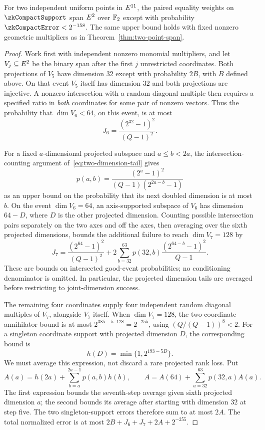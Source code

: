 \begin{theorem}\label{thm:zk-compact-two-point}
For two independent uniform points in $E^{11}$, the paired equality weights on $\zkCompactSupport$ span $E^2$ over $\mathbb{F}_2$ except with probability $\zkCompactError<2^{-158}$. The same upper bound holds with fixed nonzero geometric multipliers as in Theorem~\ref{thm:two-point-span}.
\end{theorem}
\begin{proof}
Work first with independent nonzero monomial multipliers, and let $V_j\subseteq E^2$ be the binary span after the first $j$ unrestricted coordinates. Both projections of $V_5$ have dimension $32$ except with probability $2B$, with $B$ defined above. On that event $V_5$ itself has dimension $32$ and both projections are injective. A nonzero intersection with a random diagonal multiple then requires a specified ratio in \emph{both} coordinates for some pair of nonzero vectors. Thus the probability that $\dim V_6<64$, on this event, is at most
\[
 J_6=\frac{(2^{32}-1)^2}{(Q-1)^2}.
\]

For a fixed $a$-dimensional projected subspace and $a\le b<2a$, the intersection-counting argument of~\eqref{eq:two-dimension-tail} gives
\[
 p(a,b)=\frac{(2^a-1)^2}{(Q-1)(2^{2a-b}-1)}
\]
as an upper bound on the probability that its next doubled dimension is at most $b$. On the event $\dim V_6=64$, an axis-supported subspace of $V_6$ has dimension $64-D$, where $D$ is the other projected dimension. Counting possible intersection pairs separately on the two axes and off the axes, then averaging over the sixth projected dimensions, bounds the additional failure to reach $\dim V_7=128$ by
\[
 J_7=\frac{(2^{64}-1)^2}{(Q-1)^2}
 +2\sum_{b=32}^{63}p(32,b)\frac{(2^{64-b}-1)^2}{Q-1}.
\]
These are bounds on intersected good-event probabilities; no conditioning denominator is omitted. In particular, the projected dimension tails are averaged before restricting to joint-dimension success.

The remaining four coordinates supply four independent random diagonal multiples of $V_7$, alongside $V_7$ itself. When $\dim V_7=128$, the two-coordinate annihilator bound is at most $2^{385-5\cdot128}=2^{-255}$, using $(Q/(Q-1))^8<2$. For a singleton coordinate support with projected dimension $D$, the corresponding bound is
\[
 h(D)=\min\{1,2^{193-5D}\}.
\]
We must average this expression, not discard a rare projected rank loss. Put
\[
 A(a)=h(2a)+\sum_{b=a}^{2a-1}p(a,b)h(b),
 \qquad A=A(64)+\sum_{a=32}^{63}p(32,a)A(a).
\]
The first expression bounds the seventh-step average given sixth projected dimension $a$; the second bounds its average after starting with dimension $32$ at step five. The two singleton-support errors therefore sum to at most $2A$. The total normalized error is at most $2B+J_6+J_7+2A+2^{-255}$.


\end{proof}
